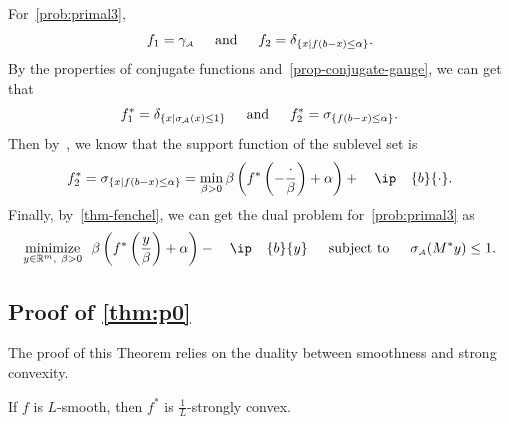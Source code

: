 For~\eqref{prob:primal3},
\[
  f_1 = \gamma_{\scriptscriptstyle\mathcal{A}} \enspace\hbox{\quad and\quad}\enspace f_2 = \delta_{\{x\mid f(b - x)\leq\alpha\}}.
\]
By the properties of conjugate functions and~\autoref{prop-conjugate-gauge}, we can get that 
\[
  f_1^* = \delta_{\{x\mid \sigma_{\scriptscriptstyle\mathcal{A}}(x)\leq1\}} \enspace\hbox{\quad and\quad}\enspace f_2^* = \sigma_{\{f(b - x)\leq\alpha\}}.\]
Then by~\cite[Example~E.2.5.3]{hiriart-urruty01}, we know that the support function of the sublevel set is 
\[f_2^* = \sigma_{\{x\mid f(b - x)\leq\alpha\}} = \min_{\beta > 0} \beta\left(f^*\left(-\frac{\cdot}{\beta}\right) + \alpha\right) + \ip{b}{\cdot}.\]
Finally, by~\autoref{thm-fenchel}, we can get the dual problem for~\eqref{prob:primal3} as
\[\minimize{y\in\Re^m,\ \beta > 0} \beta \left( f^*\left( \frac{y}{\beta} \right) + \alpha \right) - \ip{b}{y} \enspace \text{subject to}\enspace \sigma\As(M^* y) \leq 1.\]


\subsection{Proof of \autoref{thm:p0}} \label{app:main_proof}

The proof of this Theorem relies on the duality between smoothness and strong convexity.
\begin{lemma} \label{lemma:conjugate}
   If $f$ is $L$-smooth, then $f^*$ is $\frac{1}{L}$-strongly convex.
\end{lemma}

